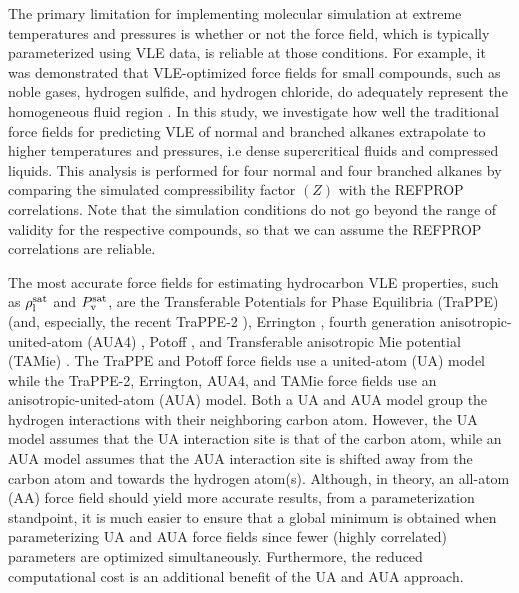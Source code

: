 \documentclass[preprint,letterpaper,floatfix,citeautoscript,aip,jcp]{revtex4-1}
\begin{document}
The primary limitation for implementing molecular simulation at extreme temperatures and pressures is whether or not the force field, which is typically parameterized using VLE data, is reliable at those conditions.  
For example, it was demonstrated that VLE-optimized force fields for small compounds, such as noble gases, hydrogen sulfide, and hydrogen chloride, do adequately represent the homogeneous fluid region \cite{Rutkai2013}. In this study, we investigate how well the traditional force fields for predicting VLE of normal and branched alkanes extrapolate to higher temperatures and pressures, i.e dense supercritical fluids and compressed liquids. This analysis is performed for four normal and four branched alkanes by comparing the simulated compressibility factor $(Z)$ with the REFPROP correlations. Note that the simulation conditions do not go beyond the range of validity for the respective compounds, so that we can assume the REFPROP correlations are reliable.

The most accurate force fields for estimating hydrocarbon VLE properties, such as $\rho_{\rm l}^{\rm sat}$ and $P_{\rm v}^{\rm sat}$, are the Transferable Potentials for Phase Equilibria (TraPPE) \cite{TraPPE,Martin1999} (and, especially, the recent TraPPE-2 \cite{TraPPEUA2}), Errington \cite{Exp6}, fourth generation anisotropic-united-atom (AUA4) \cite{AUA4,Bourasseau2002}, Potoff \cite{Mie,Potoff_branched}, and Transferable anisotropic Mie potential (TAMie) \cite{TAMie,Weidler2016}. The TraPPE and Potoff force fields use a united-atom (UA) model while the TraPPE-2, Errington, AUA4, and TAMie force fields use an anisotropic-united-atom (AUA) model. Both a UA and AUA model group the hydrogen interactions with their neighboring carbon atom. However, the UA model assumes that the UA interaction site is that of the carbon atom, while an AUA model assumes that the AUA interaction site is shifted away from the carbon atom and towards the hydrogen atom(s). Although, in theory, an all-atom (AA) force field should yield more accurate results, from a parameterization standpoint, it is much easier to ensure that a global minimum is obtained when parameterizing UA and AUA force fields since fewer (highly correlated) parameters are optimized simultaneously. Furthermore, the reduced computational cost is an additional benefit of the UA and AUA approach.
\end{document}
